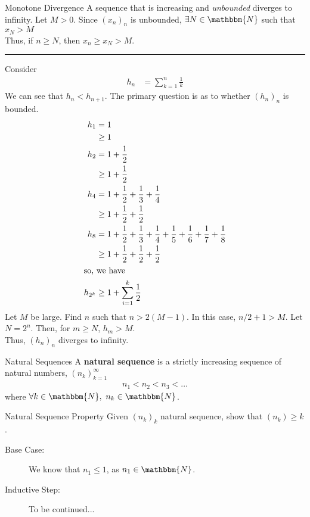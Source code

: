 \documentclass[10pt]{extarticle}
\newcommand{\N}{\mathbbm{N}}
\begin{document}
  \begin{problem}{Monotone Divergence}
    A sequence that is increasing and \textsl{unbounded} diverges to infinity.
    \tcblower
    Let $M > 0$. Since $\left(x_{n}\right)_n$ is unbounded, $\exists N\in\N$ such that $x_{N} > M$\\

    Thus, if $n \geq N$, then $x_{n} \geq x_{N} > M$.\\
    \vspace{4pt}
    \rule{\textwidth}{0.4pt}
    \vspace{4pt}
    Consider
    \begin{align*}
      h_n &= \sum_{k=1}^{n} \frac{1}{k}
    \end{align*}
    We can see that $h_{n} < h_{n+1}$. The primary question is as to whether $(h_n)_n$ is bounded.
    \begin{align*}
      h_{1} &= 1 \\&\geq 1\\
      h_{2} &= 1 + \frac{1}{2}\\ &\geq 1 + \frac{1}{2}\\
      h_{4} &= 1 + \frac{1}{2} + \frac{1}{3} + \frac{1}{4}\\ &\geq 1 + \frac{1}{2} + \frac{1}{2}\\
      h_{8} &= 1 + \frac{1}{2} + \frac{1}{3} + \frac{1}{4} + \frac{1}{5} + \frac{1}{6} + \frac{1}{7} + \frac{1}{8}\\
            &\geq 1 + \frac{1}{2}  + \frac{1}{2} + \frac{1}{2}\\
            \shortintertext{so, we have}
      h_{2^k} &\geq 1 + \sum_{i=1}^{k}\frac{1}{2}\\
    \end{align*}
    Let $M$ be large. Find $n$ such that $n > 2(M-1)$. In this case, $n/2 + 1 > M$. Let $N = 2^n$. Then, for $m \geq N$, $h_{m} > M$.\\

    Thus, $(h_n)_n$ diverges to infinity.
  \end{problem}
  \begin{problem}{Natural Sequences}
    A \textbf{natural sequence} is a strictly increasing sequence of natural numbers, $(n_{k})_{k=1}^{\infty}$
    \begin{align*}
      n_{1} < n_2 < n_3<\dots
    \end{align*}
    where $\forall k\in\N,~n_k\in\N$.
    \begin{problem}{Natural Sequence Property}
      Given $(n_k)_k$ natural sequence, show that $(n_k) \geq k$.
      \tcblower
      \begin{description}
        \item[Base Case:] We know that $n_1 \leq 1$, as $n_1\in\N$.
        \item[Inductive Step:] To be continued...
      \end{description}
    \end{problem}
  \end{problem}
\end{document}
